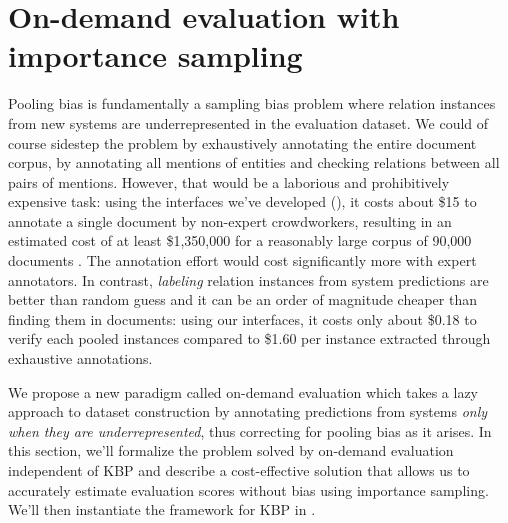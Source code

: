 \section{On-demand evaluation with importance sampling}
\label{sec:method}

Pooling bias is fundamentally a sampling bias problem where relation instances from new systems are underrepresented in the evaluation dataset.
We could of course sidestep the problem by exhaustively annotating the entire document corpus, by annotating all mentions of entities and checking relations between all pairs of mentions. However, that would be a laborious and prohibitively expensive task:
using the interfaces we've developed (), it costs about \$15 to annotate a single document by non-expert crowdworkers, resulting in an estimated cost of at least \$1,350,000 for a reasonably large corpus of 90,000 documents \citep{XXX}.
The annotation effort would cost significantly more with expert annotators.
In contrast, \textit{labeling} 
relation instances from system predictions are better than random guess and it
can be an order of magnitude cheaper than finding them in documents: using our interfaces, it costs only about \$0.18 to verify each pooled instances compared to \$1.60 per instance extracted through exhaustive annotations.

We propose a new paradigm called on-demand evaluation which takes a lazy approach to dataset construction by annotating predictions from systems \textit{only when they are underrepresented}, thus correcting for pooling bias as it arises.
In this section, we'll formalize the problem solved by on-demand evaluation independent of KBP and describe a cost-effective solution that allows us to accurately estimate evaluation scores
without bias using importance sampling.
We'll then instantiate the framework for KBP in .

